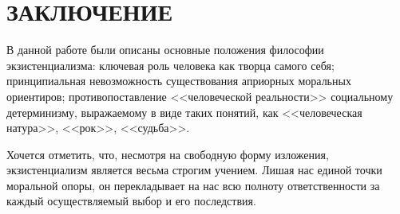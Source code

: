 \section*{ЗАКЛЮЧЕНИЕ}

В данной работе были описаны основные положения философии экзистенциализма:
ключевая роль человека как творца самого себя;
принципиальная невозможность существования априорных моральных ориентиров;
противопоставление <<человеческой реальности>>
социальному детерминизму, выражаемому в виде таких понятий,
как <<человеческая натура>>, <<рок>>, <<судьба>>.

Хочется отметить, что, несмотря на свободную форму изложения,
экзистенциализм является весьма строгим учением.
Лишая нас единой точки моральной опоры,
он перекладывает на нас всю полноту ответственности за каждый осуществляемый
выбор и его последствия.
